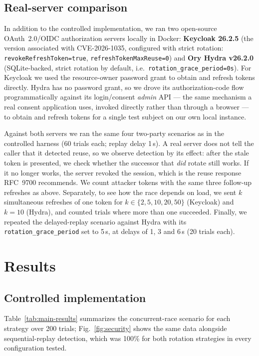 \documentclass[conference]{IEEEtran}
\begin{document}
\subsection{Real-server comparison}

In addition to the controlled implementation, we ran two open-source
OAuth~2.0/OIDC authorization servers locally in Docker: \textbf{Keycloak
26.2.5} (the version associated with CVE-2026-1035, configured with strict
rotation: \texttt{revokeRefreshToken=true}, \texttt{refreshTokenMaxReuse=0})
and \textbf{Ory Hydra v26.2.0} (SQLite-backed, strict rotation by default,
i.e.\ \texttt{rotation\_grace\_period=0s}). For Keycloak we used the
resource-owner password grant to obtain and refresh tokens directly. Hydra
has no password grant, so we drove its authorization-code flow
programmatically against its login/consent \emph{admin} API --- the same
mechanism a real consent application uses, invoked directly rather than
through a browser --- to obtain and refresh tokens for a single test
subject on our own local instance.

Against both servers we ran the same four two-party scenarios as in the
controlled harness (60 trials each; replay delay 1\,s). A real server
does not tell the caller that it detected reuse, so we observe detection
by its effect: after the stale token is presented, we check whether the
successor that \emph{did} rotate still works. If it no longer works, the
server revoked the session, which is the reuse response RFC~9700
recommends. We count attacker tokens with the same three follow-up
refreshes as above. Separately, to see how the race depends on load, we
sent $k$ simultaneous refreshes of one token for
$k \in \{2, 5, 10, 20, 50\}$ (Keycloak) and $k = 10$ (Hydra), and
counted trials where more than one succeeded. Finally, we repeated the
delayed-replay scenario against Hydra with its
\texttt{rotation\_grace\_period} set to 5\,s, at delays of 1, 3 and 6\,s
(20 trials each).

\section{Results}\label{sec:results}

\subsection{Controlled implementation}

Table~\ref{tab:main-results} summarizes the concurrent-race scenario for
each strategy over 200 trials; Fig.~\ref{fig:security} shows the same data
alongside sequential-replay detection, which was 100\% for both rotation
strategies in every configuration tested.
\end{document}
